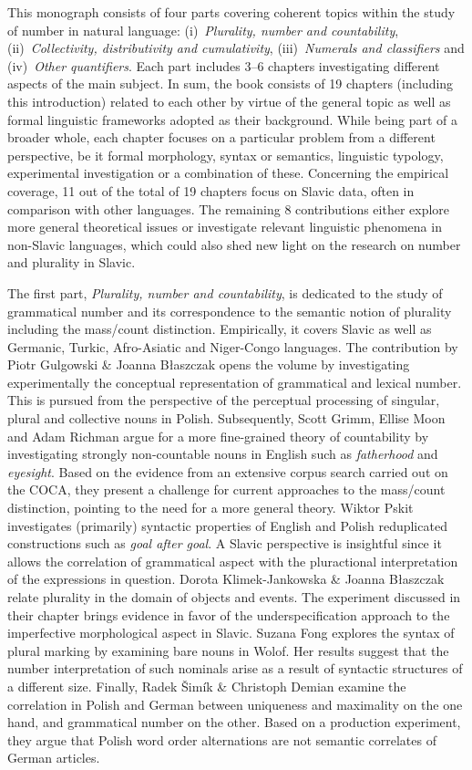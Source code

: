 \documentclass[output=paper]{langscibook}
\begin{document}
This monograph consists of four parts covering coherent topics within the study of number in natural language: (i)~\textit{Plurality, number and countability}, (ii)~\textit{Collectivity, distributivity and cumulativity}, (iii)~\textit{Numerals and classifiers} and (iv)~\textit{Other quantifiers}. Each part includes 3--6 chapters investigating different aspects of the main subject. In sum, the book consists of 19 chapters (including this introduction) related to each other by virtue of the general topic as well as formal linguistic frameworks adopted as their background. While being part of a broader whole, each chapter focuses on a particular problem from a different perspective, be it formal morphology, syntax or semantics, linguistic typology, experimental investigation or a combination of these. Concerning the empirical coverage, 11 out of the total of 19 chapters focus on Slavic data, often in comparison with other languages. The remaining 8 contributions either explore more general theoretical issues or investigate relevant linguistic phenomena in non-Slavic languages, which could also shed new light on the research on number and plurality in Slavic.

The first part, \textit{Plurality, number and countability}, is dedicated to the study of grammatical number and its correspondence to the semantic notion of plurality including the mass/count distinction. Empirically, it covers Slavic as well as Germanic, Turkic, Afro-Asiatic and Niger-Congo languages. The contribution by Piotr Gulgowski \& Joanna Błaszczak opens the volume by investigating experimentally the conceptual representation of grammatical and lexical number. This is pursued from the perspective of the perceptual processing of singular, plural and collective nouns in Polish. Subsequently, Scott Grimm, Ellise Moon and Adam Richman argue for a more fine-grained theory of countability by investigating strongly non-countable nouns in English such as \textit{fatherhood} and \textit{eyesight}. Based on the evidence from an extensive corpus search carried out on the COCA, they present a challenge for current approaches to the mass/count distinction, pointing to the need for a more general theory. Wiktor Pskit investigates (primarily) syntactic properties of English and Polish reduplicated constructions such as \textit{goal after goal}. A Slavic perspective is insightful since it allows the correlation of grammatical aspect with the pluractional interpretation of the expressions in question. Dorota Klimek-Jankowska \& Joanna Błaszczak relate plurality in the domain of objects and events. The experiment discussed in their chapter brings evidence in favor of the underspecification approach to the imperfective morphological aspect in Slavic. Suzana Fong explores the syntax of plural marking by examining bare nouns in Wolof. Her results suggest that the number interpretation of such nominals arise as a result of syntactic structures of a different size. Finally, Radek Šimík \& Christoph Demian examine the correlation in Polish and German between uniqueness and maximality on the one hand, and grammatical number on the other. Based on a production experiment, they argue that Polish word order alternations are not semantic correlates of German articles.
\end{document}
